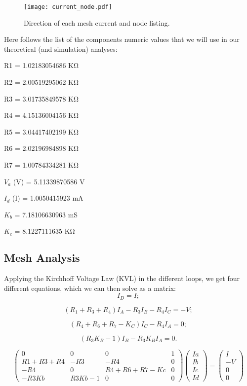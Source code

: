 \begin{figure}[h] \centering
\texttt{[image: current\_node.pdf]}
\caption{Direction of each mesh current and node listing.}
\label{fig:current}
\end{figure}

Here follows the list of the components numeric values that we will use in our theoretical (and simulation) analyses:


                                                      
R1 = 1.02183054686 K\si{\ohm}

R2 = 2.00519295062 K\si{\ohm}

R3 = 3.01735849578 K\si{\ohm}

R4 = 4.15136004156 K\si{\ohm}

R5 = 3.04417402199 K\si{\ohm}

R6 = 2.02196984898 K\si{\ohm}

R7 = 1.00784334281 K\si{\ohm}

$V_{a}$ (V) = 5.11339870586 V

$I_{d}$ (I) = 1.0050415923 mA

$K_{b}$ = 7.18106630963 mS

$K_{c}$ = 8.1227111635 K\si{\ohm}

\subsection{Mesh Analysis}


Applying the Kirchhoff Voltage Law (KVL) in the different loops, we get four different equations, which we can then solve as a matrix:
\begin{equation}
  I_D=I;
\end{equation}

\begin{equation}
  (R_1+R_3+R_4)I_A-R_3I_B-R_4I_C=-V;
\end{equation}

\begin{equation}
  (R_4+R_6+R_7-K_C)I_C-R_4I_A=0;
\end{equation}

\begin{equation}
  (R_3K_B-1)I_B-R_3K_BI_A=0.
\end{equation}

\begin{equation}
\begin{pmatrix}
0 & 0 & 0 & 1 \\
R1+R3+R4 & -R3 & -R4 & 0 \\
-R4 & 0 & R4+R6+R7-Kc & 0 \\
-R3Kb & R3Kb-1 & 0 & 0
\end{pmatrix}
\begin{pmatrix}
Ia\\
Ib\\
Ic\\
Id
\end{pmatrix}
=
\begin{pmatrix}
I\\
-V\\
0\\
0
\end{pmatrix}
\end{equation}


